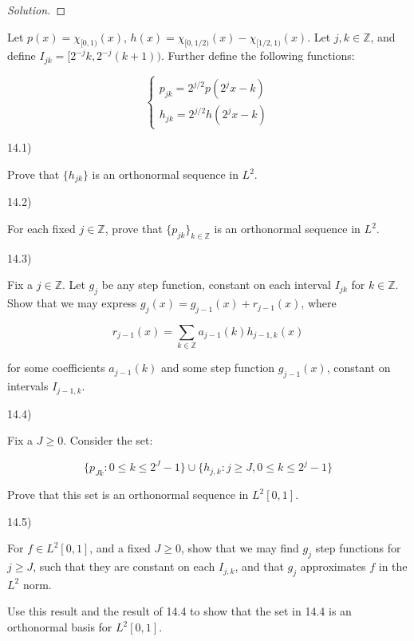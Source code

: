 \documentclass[10pt]{article}
\newenvironment{problem}[2][]{\begin{trivlist}
\item[\hskip \labelsep {\bfseries #1}\hskip \labelsep {\bfseries #2.}]}{\end{trivlist}}
\begin{document}
\begin{proof}[Solution]

\end{proof}

\begin{problem}{Question 14}

Let $p(x) = \chi_{[0,1)}(x)$, $h(x) = \chi_{[0,1/2)}(x) - \chi_{[1/2,1)}(x)$. Let $j, k \in\mathbb{Z}$, and define $I_{jk} = [2^{-j}k, 2^{-j}(k+1))$. Further define the following functions:

$$ \begin{cases} p_{jk} = 2^{j/2} p (2^{j} x - k) \\ h_{jk} = 2^{j/2} h (2^{j} x - k) \end{cases}$$

14.1)

Prove that $\{ h_{jk} \}$ is an orthonormal sequence in $L^2$.

14.2)

For each fixed $j \in \mathbb{Z}$, prove that $\{ p_{jk} \}_{k \in \mathbb{Z}}$ is an orthonormal sequence in $L^2$.  

14.3)

Fix a $j \in \mathbb{Z}$. Let $g_j$ be any step function, constant on each interval $I_{jk}$ for $k \in \mathbb{Z}$. Show that we may express $g_j(x) = g_{j-1}(x) + r_{j-1}(x)$, where

$$ r_{j-1}(x) = \sum_{k \in \mathbb{Z}} a_{j-1}(k)h_{j-1, k}(x) $$

for some coefficients $a_{j-1}(k)$ and some step function $g_{j-1}(x)$, constant on intervals $I_{j-1,k}$.

14.4)

Fix a $J \geq 0$. Consider the set:

$$ \{ p_{Jk} : 0 \leq k \leq 2^J - 1 \} \cup \{ h_{j,k} : j \geq J, 0 \leq k \leq 2^j - 1 \}$$

Prove that this set is an orthonormal sequence in $L^2[0,1]$.

14.5)

For $f \in L^2[0,1]$, and a fixed $J \geq 0$, show that we may find $g_j$ step functions for $j \geq J$, such that they are constant on each $I_{j,k}$, and that $g_j$ approximates $f$ in the $L^2$ norm.

Use this result and the result of 14.4 to show that the set in 14.4 is an orthonormal basis for $L^2[0,1]$.


\end{problem}
\end{document}
